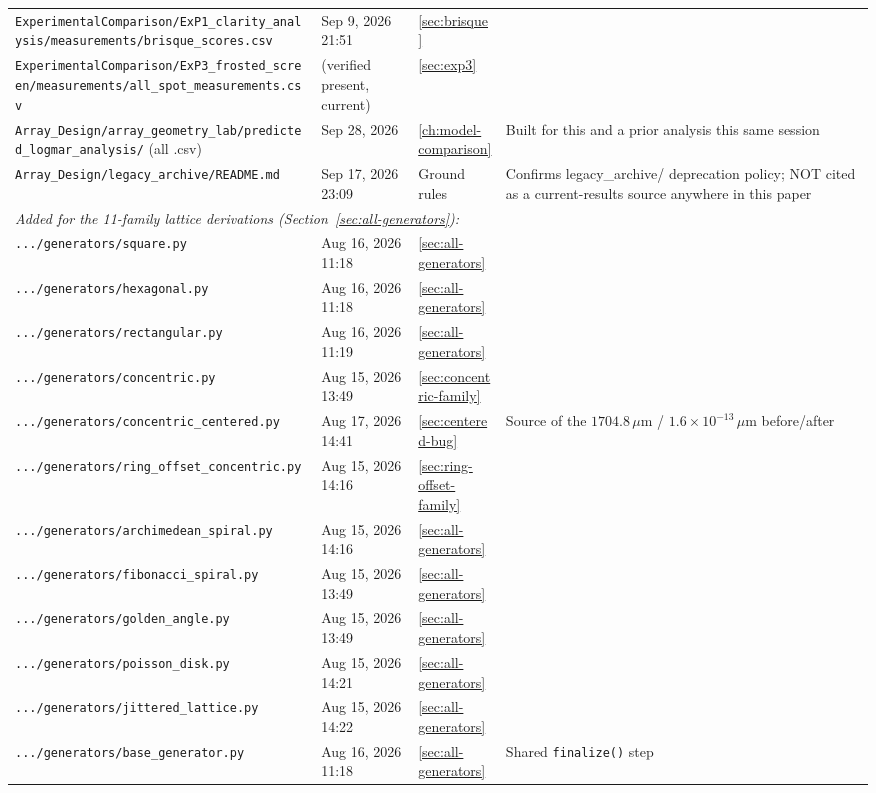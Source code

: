 \begin{longtable}{p{5.8cm}p{2.4cm}p{1.2cm}p{5.4cm}}
\texttt{ExperimentalComparison/ExP1\_clarity\_analysis/measurements/brisque\_scores.csv} & Sep 9, 2026 21:51 & \ref{sec:brisque} & \\
\texttt{ExperimentalComparison/ExP3\_frosted\_screen/measurements/all\_spot\_measurements.csv} & (verified present, current) & \ref{sec:exp3} & \\
\texttt{Array\_Design/array\_geometry\_lab/predicted\_logmar\_analysis/} (all .csv) & Sep 28, 2026 & \ref{ch:model-comparison} & Built for this and a prior analysis this same session \\
\texttt{Array\_Design/legacy\_archive/README.md} & Sep 17, 2026 23:09 & Ground rules & Confirms legacy\_archive/ deprecation policy; NOT cited as a current-results source anywhere in this paper \\
\midrule
\multicolumn{4}{l}{\textit{Added for the 11-family lattice derivations (Section~\ref{sec:all-generators}):}} \\
\texttt{.../generators/square.py} & Aug 16, 2026 11:18 & \ref{sec:all-generators} & \\
\texttt{.../generators/hexagonal.py} & Aug 16, 2026 11:18 & \ref{sec:all-generators} & \\
\texttt{.../generators/rectangular.py} & Aug 16, 2026 11:19 & \ref{sec:all-generators} & \\
\texttt{.../generators/concentric.py} & Aug 15, 2026 13:49 & \ref{sec:concentric-family} & \\
\texttt{.../generators/concentric\_centered.py} & Aug 17, 2026 14:41 & \ref{sec:centered-bug} & Source of the $1704.8\,\mu$m / $1.6{\times}10^{-13}\,\mu$m before/after \\
\texttt{.../generators/ring\_offset\_concentric.py} & Aug 15, 2026 14:16 & \ref{sec:ring-offset-family} & \\
\texttt{.../generators/archimedean\_spiral.py} & Aug 15, 2026 14:16 & \ref{sec:all-generators} & \\
\texttt{.../generators/fibonacci\_spiral.py} & Aug 15, 2026 13:49 & \ref{sec:all-generators} & \\
\texttt{.../generators/golden\_angle.py} & Aug 15, 2026 13:49 & \ref{sec:all-generators} & \\
\texttt{.../generators/poisson\_disk.py} & Aug 15, 2026 14:21 & \ref{sec:all-generators} & \\
\texttt{.../generators/jittered\_lattice.py} & Aug 15, 2026 14:22 & \ref{sec:all-generators} & \\
\texttt{.../generators/base\_generator.py} & Aug 16, 2026 11:18 & \ref{sec:all-generators} & Shared \texttt{finalize()} step \\

\end{longtable}
